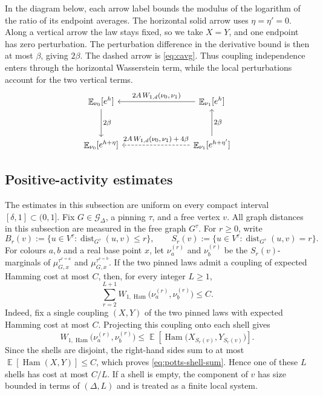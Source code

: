 \documentclass[11pt,reqno]{article}
\theoremstyle{plain}
\theoremstyle{definition}
\theoremstyle{remark}
\theoremstyle{definition}
\theoremstyle{remark}
\newcommand{\dist}{\operatorname{dist}}
\DeclareMathOperator{\E}{\mathbb{E}}
\DeclareMathOperator{\Ham}{Ham}
\newcommand{\Deg}{\Delta}                        %
\newcommand{\Wd}{W_{1,d}}                        %
\newcommand{\WHam}{W_{1,\Ham}}                   %
\newcommand{\Gdeg}{\mathcal{G}_{\Deg}}
\newcommand{\mupin}[3]{\mu_{#1,#3}^{#2}}
\begin{document}
In the diagram below, each arrow label bounds the modulus of the
logarithm of the ratio of its endpoint averages.  The horizontal solid arrow uses
\(\eta=\eta'=0\).  Along a vertical arrow the law stays fixed, so we
take \(X=Y\), and one endpoint has zero perturbation.  The perturbation
difference in the derivative bound is then at most \(\beta\), giving
\(2\beta\).
The dashed arrow is \eqref{eq:cavg}.  Thus coupling independence enters
through the horizontal Wasserstein term, while the local perturbations
account for the two vertical terms.
\[
  \begin{tikzcd}[column sep=8em,row sep=3.2em,labels={font=\footnotesize}]
    \E_{\nu_0}[e^h]
      \arrow[d, "{2\beta}"]
      &
    \E_{\nu_1}[e^h]
      \arrow[l, "{2A\,\Wd(\nu_0,\nu_1)}"']
      \\
    \E_{\nu_0}[e^{h+\eta}]
      &
    \E_{\nu_1}[e^{h+\eta'}]
      \arrow[u, "{2\beta}"']
      \arrow[l, dashed, "{2A\,\Wd(\nu_0,\nu_1)+4\beta}"']
  \end{tikzcd}
\]

\subsection{Positive-activity estimates}
\label{sec:potts-induction}

The estimates in this subsection are uniform on every compact interval
\([\delta,1]\subset(0,1]\).
Fix \(G\in\Gdeg\), a pinning \(\tau\), and a free vertex \(v\).  All
graph distances in this subsection are measured in the free graph \(G^\tau\).
For \(r\ge0\), write
\[
  B_r(v):=\{u\in V^\tau:\dist_{G^\tau}(u,v)\le r\},
  \qquad
  S_r(v):=\{u\in V^\tau:\dist_{G^\tau}(u,v)=r\}.
\]
For colours \(a,b\) and a real base point \(x\), let \(\nu_a^{(r)}\) and
\(\nu_b^{(r)}\) be the \(S_r(v)\)-marginals of
\(\mupin{G}{\tau^{v=a}}{x}\) and \(\mupin{G}{\tau^{v=b}}{x}\).  If the
two pinned laws admit a coupling of expected Hamming cost at most \(C\),
then, for every integer \(L\ge1\),
\begin{equation}\label{eq:potts-shell-sum}
  \sum_{r=2}^{L+1}
    \WHam\bigl(\nu_a^{(r)},\nu_b^{(r)}\bigr)
  \le C.
\end{equation}
Indeed, fix a single coupling \((X,Y)\) of the two pinned laws with
expected Hamming cost at most \(C\).  Projecting this coupling onto each
shell gives
\[
  \WHam\bigl(\nu_a^{(r)},\nu_b^{(r)}\bigr)
  \le\E\!\left[\Ham\bigl(X_{S_r(v)},Y_{S_r(v)}\bigr)\right].
\]
Since the shells are disjoint, the right-hand sides sum to at most
\(\E[\Ham(X,Y)]\le C\), which proves \eqref{eq:potts-shell-sum}.
Hence one of these \(L\) shells has cost at most \(C/L\).  If a
shell is empty, the component of \(v\) has size bounded in terms of
\((\Deg,L)\) and is treated as a finite local system.
\end{document}
